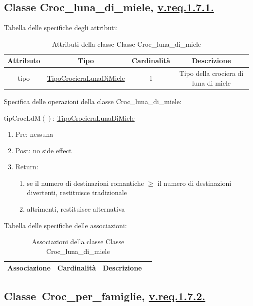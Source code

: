 \documentclass{article}
\begin{document}
\subsection*{Classe Croc\_luna\_di\_miele, \hyperref[sec:RequisitiCrocieraTipoLunaDiMiele]{v.req.1.7.1.}}\label{sec:Croc_luna_di_miele}
Tabella delle specifiche degli attributi:
\begin{table}[h!]
    \centering
    \begin{tabular}{|c|c|c|c|}
        \hline
        Attributo & Tipo & Cardinalità & Descrizione \\
        \hline
        tipo & \hyperref[sec:TipoCrocieraLunaDiMiele]{TipoCrocieraLunaDiMiele} & 1 & Tipo della crociera di luna di miele \\
        \hline
    \end{tabular}
    \caption{Attributi della classe Classe Croc\_luna\_di\_miele}
\end{table}

Specifica delle operazioni della classe Croc\_luna\_di\_miele:

tipCrocLdM$()$: \hyperref[sec:TipoCrocieraLunaDiMiele]{TipoCrocieraLunaDiMiele}
\begin{enumerate}
    \item Pre: nessuna
    \item Post: no side effect
    \item Return:
    \begin{enumerate}
        \item se il numero di destinazioni romantiche $\geq$ il numero di destinazioni divertenti, restituisce tradizionale
        \item altrimenti, restituisce alternativa
    \end{enumerate}
\end{enumerate}

Tabella delle specifiche delle associazioni:
\begin{table}[h!]
    \centering
    \begin{tabular}{|c|c|c|c|}
        \hline
        Associazione & Cardinalità & Descrizione \\
        \hline
        \hline
    \end{tabular}
    \caption{Associazioni della classe Classe Croc\_luna\_di\_miele}
\end{table}

\subsection*{Classe\ Croc\_per\_famiglie, \hyperref[sec:RequisitiCrocieraTipoPerFamiglie]{v.req.1.7.2.}}\label{sec:Croc_per_famiglie}
\end{document}
